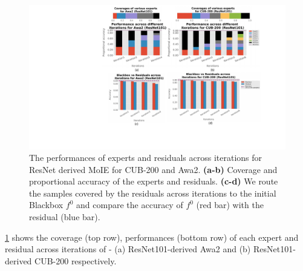 \begin{figure}[h]
\centering
\includegraphics[width=1\linewidth]{figures/Supp/Expert_resnet.pdf}
\caption{The performances of experts and residuals across iterations for ResNet derived MoIE for CUB-200 and Awa2. 
\textbf{(a-b)} Coverage and proportional accuracy of the experts and residuals. 
\textbf{(c-d)} We route the samples covered by the residuals across iterations to the initial Blackbox $f^0$ and compare the accuracy of $f^0$ (red bar) with the residual (blue bar).}
\label{fig:expert_performance_cv_resnet}
\end{figure}

\cref{fig:expert_performance_cv_resnet} shows the coverage (top row), performances (bottom row) of each expert and residual across iterations of - (a) ResNet101-derived Awa2 and (b) ResNet101-derived CUB-200 respectively.